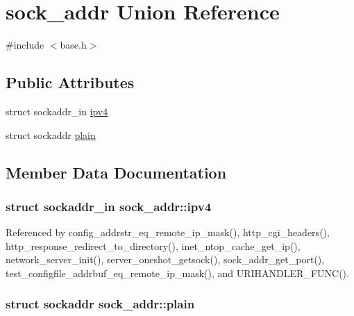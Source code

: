 \hypertarget{unionsock__addr}{\section{sock\-\_\-addr Union Reference}
\label{unionsock__addr}
}


{\ttfamily \#include $<$base.\-h$>$}

\subsection*{Public Attributes}
\begin{DoxyCompactItemize}
\item 
struct sockaddr\-\_\-in \hyperlink{unionsock__addr_ae02b8ce6921dd8d356094300a1424715}{ipv4}
\item 
struct sockaddr \hyperlink{unionsock__addr_a20f15a4356223710f9b61aa4fd959b05}{plain}
\end{DoxyCompactItemize}


\subsection{Member Data Documentation}
\hypertarget{unionsock__addr_ae02b8ce6921dd8d356094300a1424715}{
\subsubsection[{ipv4}]{\setlength{\rightskip}{0pt plus 5cm}struct sockaddr\-\_\-in sock\-\_\-addr\-::ipv4}}\label{unionsock__addr_ae02b8ce6921dd8d356094300a1424715}


Referenced by config\-\_\-addrstr\-\_\-eq\-\_\-remote\-\_\-ip\-\_\-mask(), http\-\_\-cgi\-\_\-headers(), http\-\_\-response\-\_\-redirect\-\_\-to\-\_\-directory(), inet\-\_\-ntop\-\_\-cache\-\_\-get\-\_\-ip(), network\-\_\-server\-\_\-init(), server\-\_\-oneshot\-\_\-getsock(), sock\-\_\-addr\-\_\-get\-\_\-port(), test\-\_\-configfile\-\_\-addrbuf\-\_\-eq\-\_\-remote\-\_\-ip\-\_\-mask(), and U\-R\-I\-H\-A\-N\-D\-L\-E\-R\-\_\-\-F\-U\-N\-C().

\hypertarget{unionsock__addr_a20f15a4356223710f9b61aa4fd959b05}{
\subsubsection[{plain}]{\setlength{\rightskip}{0pt plus 5cm}struct sockaddr sock\-\_\-addr\-::plain}}\label{unionsock__addr_a20f15a4356223710f9b61aa4fd959b05}


